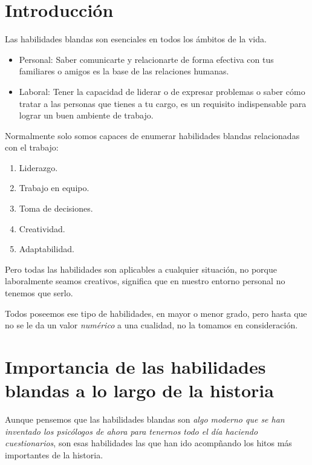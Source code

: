
\section{Introducción}

Las habilidades blandas son esenciales en todos los ámbitos de la vida.

\begin{itemize}
	\item Personal: Saber comunicarte y relacionarte de forma efectiva con tus familiares o amigos es la base de las relaciones humanas.
	\item Laboral: Tener la capacidad de liderar o de expresar problemas o saber cómo tratar a las personas que tienes a tu cargo, es un requisito indispensable para lograr un buen ambiente de trabajo.
\end{itemize}

Normalmente solo somos capaces de enumerar habilidades blandas relacionadas con el trabajo:

\begin{enumerate}
	\item Liderazgo.
	\item Trabajo en equipo.
	\item	Toma de decisiones.
	\item Creatividad.
	\item Adaptabilidad.
\end{enumerate}

Pero todas las habilidades son aplicables a cualquier situación, no porque laboralmente seamos creativos, significa que en nuestro entorno personal no tenemos que serlo.

Todos poseemos ese tipo de habilidades, en mayor o menor grado, pero hasta que no se le da un valor \textit{numérico} a una cualidad, no la tomamos en consideración.	

\section{Importancia de las habilidades blandas a lo largo de la historia}

Aunque pensemos que las habilidades blandas son \textit{algo moderno que se han inventado los psicólogos de ahora para tenernos todo el día haciendo cuestionarios}, son esas habilidades las que han ido acompñando los hitos más importantes de la historia.

